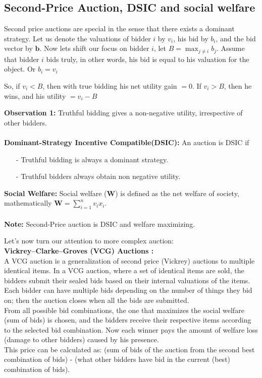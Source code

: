 \documentclass[a4paper]{article}
\begin{document}
\subsection*{Second-Price Auction, DSIC and social welfare \cite{stanford}}
Second price auctions are special in the sense that there exists a dominant strategy.
Let us denote the valuations of bidder $i$ by $v_i$, his bid by $b_i$, and the bid vector by $\mathbf{b}$. Now lets shift our focus on bidder $i$, let $B = \max_{j\ne i} b_j$. 
Assume that bidder $i$ bids truly, in other words, his bid is equal to his valuation for the object. Or $b_i = v_i$

So, if $v_i < B$, then with true bidding his net utility gain $= 0$. If $v_i > B$, then he wins, and his utility $= v_i - B$

\textbf{Observation 1:} Truthful bidding gives a non-negative utility, irrespective of other bidders.  \\ \\
\textbf{Dominant-Strategy Incentive Compatible(DSIC)\cite{stanford}:} An auction is DSIC if
\begin{itemize}
    \item[-] Truthful bidding is always a dominant strategy.
    \item[-] Truthful bidders always obtain non negative utility.
\end{itemize}
\textbf{Social Welfare\cite{stanford}:} Social welfare ($\mathbf{W}$) is defined as the net welfare of society, mathematically $\mathbf{W} = \sum_{i=1}^{n}v_i x_i$. \\ \\
\textbf{Note:} Second-Price auction is DSIC and welfare maximizing.


\pagebreak
Let's now turn our attention to more complex auction: \\

\textbf{ Vickrey–Clarke–Groves (VCG) Auctions \cite{vijay}:}\\

A VCG auction is a generalization of second price (Vickrey) auctions to multiple identical items. In a VCG auction, where a set of identical items are sold, the bidders submit their sealed bids based on their internal valuations of the items. Each bidder can have multiple bids depending on the number of things they bid on; then the auction closes when all the bids are submitted.
\\
From all possible bid combinations, the one that maximizes the social welfare (sum of bids) is chosen, and the bidders receive their respective items according to the selected bid combination. Now each winner pays the amount of welfare loss (damage to other bidders) caused by his presence.
\\
This price can be calculated as: (sum of bids of the auction from the second best combination of bids) - (what other bidders have bid in the current (best) combination of bids).
\end{document}
